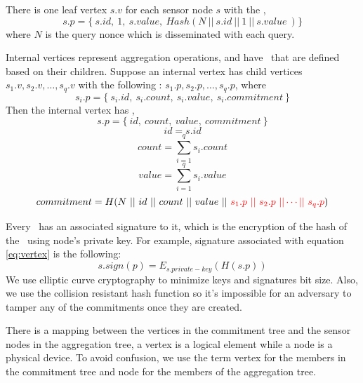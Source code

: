 	There is one leaf vertex $s.v$ for each sensor node $s$ with the \payload,
	\begin{equation}\label{eq:vertex}
		s.p = \{\ s.id,\ 1,\ s.value,\ Hash( N\ ||\  s.id\ ||\  1\  ||\  s.value\ ) \} 
	\end{equation}
	where $N$ is the query nonce which is disseminated with each query.

	Internal vertices represent aggregation operations, and have \payloads\  that are defined based on their children. Suppose an internal vertex has child vertices $s_{1}.v, s_{2}.v,\dotsc, s_{q}.v$ with the following \payloads: $s_{1}.p, s_{2}.p,\dotsc, s_{q}.p$, where
	\begin{equation}\label{def:internal-vertice}
		s_{i}.p = \{\ s_{i}.id,\ s_{i}.count,\ s_{i}.value,\ s_{i}.commitment\ \}
	\end{equation}
	Then the internal vertex has \payload, 
	\begin{equation}
		s.p = \{\ id,\ count,\ value,\ commitment\ \} 
	\end{equation}
	\begin{equation}
		id = s.id 
	\end{equation}	
	\begin{equation}
		count = \sum\limits_{i=1}^q {s_{i}.count}		
	\end{equation}
	\begin{equation}
		value = \sum\limits_{i=1}^q {s_{i}.value}		
	\end{equation}
	\begin{equation}
		commitment = H (N\ ||\ id\ ||\ count\ ||\ value\ ||\textcolor{red}{\ s_{1}.p\ ||\ s_{2}.p\ || \dotsb ||\ s_{q}.p})		
	\end{equation}

	Every \payload\ has an associated signature to it, which is the encryption of the hash of the \payload\ using node's private key. For example, signature associated with equation \ref{eq:vertex} is the following:  
	\begin{equation}
		s.sign(p) = E_{s.{private-key}}(H (s.p))
	\end{equation}
	We use elliptic curve cryptography to minimize keys and signatures bit size. 
	Also, we use the collision resistant hash function so it's impossible for an adversary to tamper any of the commitments once they are created.

	There is a mapping between the vertices in the commitment tree and the sensor nodes in the aggregation tree, a vertex is a logical element while a node is a physical device.
	To avoid confusion, we use the term vertex for the members in the commitment tree and node for the members of the aggregation tree.
	

